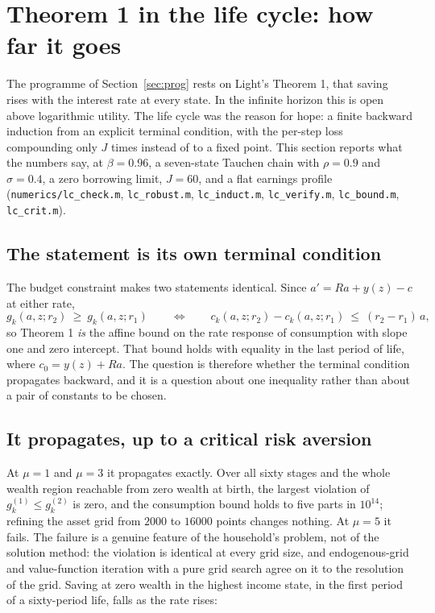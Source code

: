 \section{Theorem 1 in the life cycle: how far it goes}\label{sec:thm1}

The programme of Section~\ref{sec:prog} rests on Light's Theorem 1, that saving rises with the
interest rate at every state. In the infinite horizon this is open above logarithmic utility. The
life cycle was the reason for hope: a finite backward induction from an explicit terminal
condition, with the per-step loss compounding only $J$ times instead of to a fixed point. This
section reports what the numbers say, at $\beta=0.96$, a seven-state Tauchen chain with
$\rho=0.9$ and $\sigma=0.4$, a zero borrowing limit, $J=60$, and a flat earnings profile
(\texttt{numerics/lc\_check.m}, \texttt{lc\_robust.m}, \texttt{lc\_induct.m},
\texttt{lc\_verify.m}, \texttt{lc\_bound.m}, \texttt{lc\_crit.m}).

\subsection{The statement is its own terminal condition}

The budget constraint makes two statements identical. Since $a'=Ra+y(z)-c$ at either rate,
\[
  g_k(a,z;r_2)\ \ge\ g_k(a,z;r_1)
  \qquad\Longleftrightarrow\qquad
  c_k(a,z;r_2)-c_k(a,z;r_1)\ \le\ (r_2-r_1)\,a ,
\]
so Theorem 1 \emph{is} the affine bound on the rate response of consumption with slope one and
zero intercept. That bound holds with equality in the last period of life, where $c_0=y(z)+Ra$.
The question is therefore whether the terminal condition propagates backward, and it is a
question about one inequality rather than about a pair of constants to be chosen.

\subsection{It propagates, up to a critical risk aversion}

At $\mu=1$ and $\mu=3$ it propagates exactly. Over all sixty stages and the whole wealth region
reachable from zero wealth at birth, the largest violation of $g_k^{(1)}\le g_k^{(2)}$ is zero,
and the consumption bound holds to five parts in $10^{14}$; refining the asset grid from $2000$
to $16000$ points changes nothing. At $\mu=5$ it fails. The failure is a genuine feature of the
household's problem, not of the solution method: the violation is identical at every grid size,
and endogenous-grid and value-function iteration with a pure grid search agree on it to the
resolution of the grid. Saving at zero wealth in the highest income state, in the first period of
a sixty-period life, falls as the rate rises:


